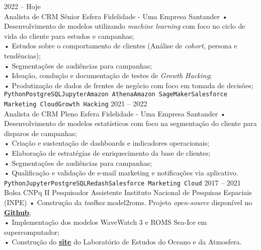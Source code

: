 \documentclass[9pt]{developercv} %
\begin{document}
\begin{entrylist}
	\entry
		{2022 --  Hoje\\}
		{Analista de CRM Sênior}
		{Esfera Fidelidade - Uma Empresa Santander}
		{• Desenvolvimento de modelos utilizando \textit{machine learning} com foco no ciclo de vida do cliente para estudos e campanhas;\\
		• Estudos sobre o comportamento de clientes (Análise de \textit{cohort}, persona e tendências);\\ 
		• Segmentações de audiências para campanhas;\\
		• Ideação, condução e documentação de testes de \textit{Growth Hacking};\\
		• Produtização de dados de frentes de negócio com foco em tomada de decisões;\\
		\texttt{Python}\slashsep\texttt{PostgreSQL}\slashsep\texttt{Jupyter}\slashsep\texttt{Amazon Athena}\slashsep\texttt{Amazon SageMaker}\slashsep\texttt{Salesforce Marketing Cloud}\slashsep\texttt{Growth Hacking}}
		\entry
		{2021 --  2022\\}
		{Analista de CRM Pleno}
		{Esfera Fidelidade - Uma Empresa Santander}
		{• Desenvolvimento de modelos estatísticos com foco na segmentação do cliente para disparos de campanhas;\\
		• Criação e sustentação de dashboards e indicadores operacionais;\\
		• Elaboração de estratégias de enriquecimento da base de clientes;\\
		• Segmentações de audiências para campanhas;\\
		• Qualificação e validação de e-mail marketing e notificações via aplicativo.\\
		\texttt{Python}\slashsep\texttt{Jupyter}\slashsep\texttt{PostgreSQL}\slashsep\texttt{Redash}\slashsep\texttt{Salesforce Marketing Cloud}}
		\entry
		{2017 -- 2021\\\footnotesize{Bolsa CNPq II}}
		{Pesquisador Assistente}
		{Instituto Nacional de Pesquisas Espaciais (INPE)}
		{• Construção da \textit{toolbox} model2roms. Projeto \textit{open-source} disponível no \href{https://github.com/uesleisutil/model2roms}{\textcolor{bleu_cite}{\textbf{Github}}}; \\	
		• Implementação dos modelos WaveWatch 3 e ROMS Sea-Ice em supercomputador;\\
		• Construção do \href{https://loa-inpe.github.io/}{\textcolor{bleu_cite}{\textbf{site}}} do Laboratório de Estudos do Oceano e da Atmosfera. \\
}
\end{entrylist}
\end{document}
